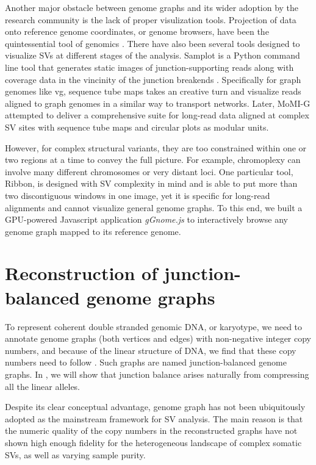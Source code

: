 \documentclass[phd,tocprelim]{cornell}
\begin{document}
Another major obstacle between genome graphs and its wider adoption by the research community is the lack of proper visulization tools. Projection of data onto reference genome coordinates, or genome browsers, have been the quintessential tool of genomics \cite{Robinson2011-ra,kent2002-ke}. There have also been several tools designed to visualize SVs at different stages of the analysis. Samplot is a Python command line tool that generates static images of junction-supporting reads along with coverage data in the vincinity of the junction breakends \cite{Belyeu2021-tm}. Specifically for graph genomes like vg, sequence tube maps \cite{Beyer2019-nb} takes an creative turn and visualize reads aligned to graph genomes in a similar way to transport networks. Later, MoMI-G \cite{Yokoyama2019-xd} attempted to deliver a comprehensive suite for long-read data aligned at complex SV sites with sequence tube maps and circular plots as modular units.

However, for complex structural variants, they are too constrained within one or two regions at a time to convey the full picture. For example, chromoplexy can involve many different chromosomes or very distant loci. One particular tool, Ribbon\cite{Nattestad2016-dn,Nattestad2018-wl}, is designed with SV complexity in mind and is able to put more than two discontiguous windows in one image, yet it is specific for long-read alignments and cannot visualize general genome graphs. To this end, we built a GPU-powered Javascript application \textit{gGnome.js} to interactively browse any genome graph mapped to its reference genome.

\section{Reconstruction of junction-balanced genome graphs}
To represent coherent double stranded genomic DNA, or karyotype, we need to annotate genome graphs (both vertices and edges) with non-negative integer copy numbers, and because of the linear structure of DNA, we find that these copy numbers need to follow . Such graphs are named junction-balanced genome graphs. In , we will show that junction balance arises naturally from compressing all the linear alleles.

Despite its clear conceptual advantage, genome graph has not been ubiquitously adopted as the mainstream framework for SV analysis. The main reason is that the numeric quality of the copy numbers in the reconstructed graphs have not shown high enough fidelity for the heterogeneous landscape of complex somatic SVs, as well as varying sample purity. 
\end{document}
